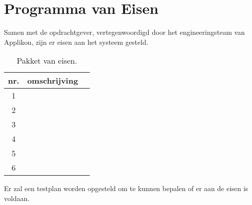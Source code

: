 \section{Programma van Eisen}
Samen met de opdrachtgever, vertegenwoordigd door het engineeringsteam van Applikon, zijn er eisen aan het systeem gesteld. 

\begin{table}[H]
		\centering
		\caption{Pakket van eisen.}
		\label{tab:PakketvanEisen}
		\begin{tabular}{clc}
			\toprule
			nr. & omschrijving  &  \\ 
			\midrule
			1 & &   \\
			2 & &   \\
			3 &  &  \\
			4 &  &  \\
			5 &  &  \\
			6 &  &  \\
			\bottomrule
		\end{tabular}
\end{table}


Er zal een testplan worden opgesteld om te kunnen bepalen of er aan de eisen is voldaan. 